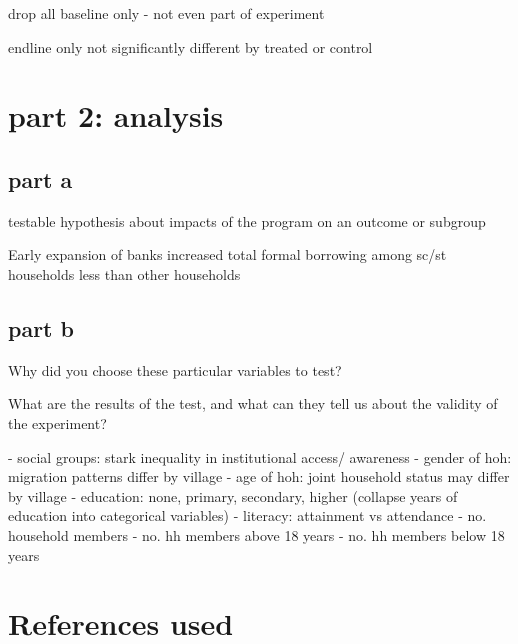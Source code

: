 \documentclass[12pt]{article}
\begin{document}
drop all baseline only - not even part of experiment

endline only not significantly different by treated or control

\section{part 2: analysis}

\subsection{part a}

testable hypothesis about impacts of the program on an outcome or subgroup

Early expansion of banks increased total formal borrowing among sc/st households less than other households

\subsection{part b}

Why did you choose these particular variables to test?

What are the results of the test, and what can they tell us about the validity of the
experiment?


- social groups: stark inequality in institutional access/ awareness
- gender of hoh: migration patterns differ by village
- age of hoh: joint household status may differ by village
- education: none, primary, secondary, higher (collapse years of education into categorical variables)
- literacy: attainment vs attendance
- no. household members
- no. hh members above 18 years
- no. hh members below 18 years



\section{References used}
\end{document}
